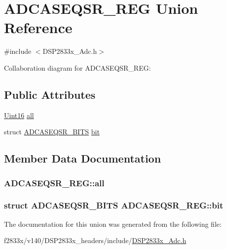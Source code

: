 \hypertarget{union_a_d_c_a_s_e_q_s_r___r_e_g}{}\section{A\+D\+C\+A\+S\+E\+Q\+S\+R\+\_\+\+R\+E\+G Union Reference}
\label{union_a_d_c_a_s_e_q_s_r___r_e_g}


{\ttfamily \#include $<$D\+S\+P2833x\+\_\+\+Adc.\+h$>$}



Collaboration diagram for A\+D\+C\+A\+S\+E\+Q\+S\+R\+\_\+\+R\+E\+G\+:
\subsection*{Public Attributes}
\begin{DoxyCompactItemize}
\item 
\hyperlink{_d_s_p2833x___device_8h_a59a9f6be4562c327cbfb4f7e8e18f08b}{Uint16} \hyperlink{union_a_d_c_a_s_e_q_s_r___r_e_g_a01841de7fb297798f0c634c8089fa1d8}{all}
\item 
struct \hyperlink{struct_a_d_c_a_s_e_q_s_r___b_i_t_s}{A\+D\+C\+A\+S\+E\+Q\+S\+R\+\_\+\+B\+I\+T\+S} \hyperlink{union_a_d_c_a_s_e_q_s_r___r_e_g_a1719ca21397456e7773f90f443fc2452}{bit}
\end{DoxyCompactItemize}


\subsection{Member Data Documentation}
\hypertarget{union_a_d_c_a_s_e_q_s_r___r_e_g_a01841de7fb297798f0c634c8089fa1d8}{}
\subsubsection[{all}]{ A\+D\+C\+A\+S\+E\+Q\+S\+R\+\_\+\+R\+E\+G\+::all}\label{union_a_d_c_a_s_e_q_s_r___r_e_g_a01841de7fb297798f0c634c8089fa1d8}
\hypertarget{union_a_d_c_a_s_e_q_s_r___r_e_g_a1719ca21397456e7773f90f443fc2452}{}
\subsubsection[{bit}]{\setlength{\rightskip}{0pt plus 5cm}struct {\bf A\+D\+C\+A\+S\+E\+Q\+S\+R\+\_\+\+B\+I\+T\+S} A\+D\+C\+A\+S\+E\+Q\+S\+R\+\_\+\+R\+E\+G\+::bit}\label{union_a_d_c_a_s_e_q_s_r___r_e_g_a1719ca21397456e7773f90f443fc2452}


The documentation for this union was generated from the following file\+:\begin{DoxyCompactItemize}
\item 
f2833x/v140/\+D\+S\+P2833x\+\_\+headers/include/\hyperlink{_d_s_p2833x___adc_8h}{D\+S\+P2833x\+\_\+\+Adc.\+h}\end{DoxyCompactItemize}
